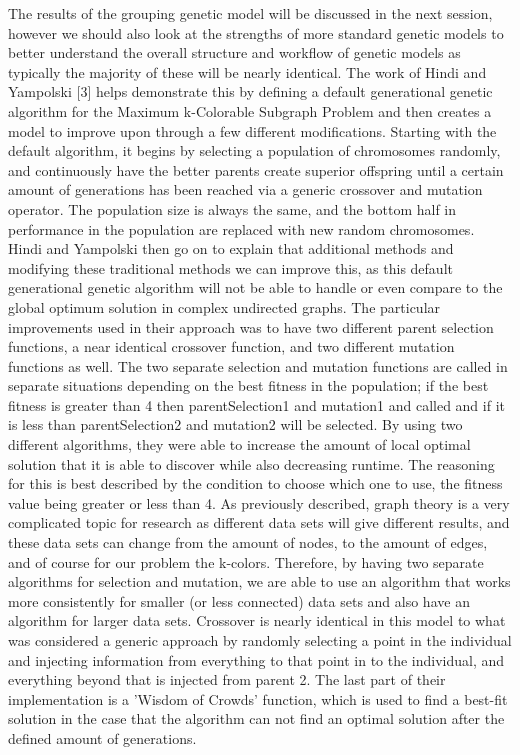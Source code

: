 \documentclass{article}
\begin{document}
 \par The results of the grouping genetic model will be discussed in the next session, however we should also look at the strengths of more standard genetic models to better understand the overall structure and workflow of genetic models as typically the majority of these will be nearly identical. The work of Hindi and Yampolski [3] helps demonstrate this by defining a default generational genetic algorithm for the Maximum k-Colorable Subgraph Problem and then creates a model to improve upon through a few different modifications. Starting with the default algorithm, it begins by selecting a population of chromosomes randomly, and continuously have the better parents create superior offspring until a certain amount of generations has been reached via a generic crossover and mutation operator. The population size is always the same, and the bottom half in performance in the population are replaced with new random chromosomes. Hindi and Yampolski then go on to explain that additional methods and modifying these traditional methods we can improve this, as this default generational genetic algorithm will not be able to handle or even compare to the global optimum solution in complex undirected graphs. The particular improvements used in their approach was to have two different parent selection functions, a near identical crossover function, and two different mutation functions as well. The two separate selection and mutation functions are called in separate situations depending on the best fitness in the population; if the best fitness is greater than 4 then parentSelection1 and mutation1 and called and if it is less than parentSelection2 and mutation2 will be selected. By using two different algorithms, they were able to increase the amount of local optimal solution that it is able to discover while also decreasing runtime. The reasoning for this is best described by the condition to choose which one to use, the fitness value being greater or less than 4. As previously described, graph theory is a very complicated topic for research as different data sets will give different results, and these data sets can change from the amount of nodes, to the amount of edges, and of course for our problem the k-colors. Therefore, by having two separate algorithms for selection and mutation, we are able to use an algorithm that works more consistently for smaller (or less connected) data sets and also have an algorithm for larger data sets. Crossover is nearly identical in this model to what was considered a generic approach by randomly selecting a point in the individual and injecting information from everything to that point in to the individual, and everything beyond that is injected from parent 2. The last part of their implementation is a 'Wisdom of Crowds' function, which is used to find a best-fit solution in the case that the algorithm can not find an optimal solution after the defined amount of generations. 
\end{document}
